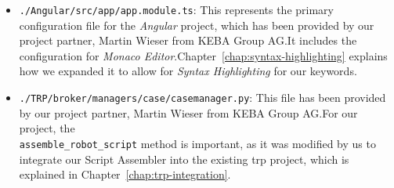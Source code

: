 \begin{itemize}
    \item \verb|./Angular/src/app/app.module.ts|: This represents the primary configuration file for the \textit{Angular} project, which has been provided by our project partner, Martin Wieser from KEBA Group AG.\@ It includes the configuration for \textit{Monaco Editor}.\@ Chapter~\ref{chap:syntax-highlighting} explains how we expanded it to allow for \textit{Syntax Highlighting} for our keywords.
    \item \verb|./TRP/broker/managers/case/casemanager.py|: This file has been provided by our project partner, Martin Wieser from KEBA Group AG.\@ For our project, the\\ \verb|assemble_robot_script| method is important, as it was modified by us to integrate our Script Assembler into the existing \gls{trp} project, which is explained in Chapter~\ref{chap:trp-integration}.
\end{itemize}
